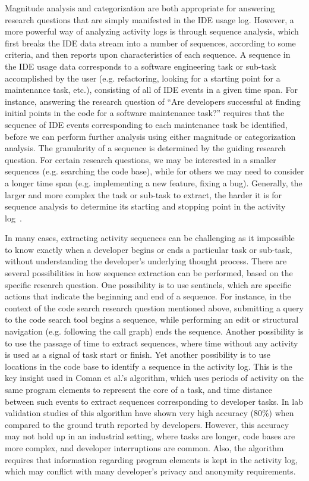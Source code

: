 Magnitude analysis and categorization are both appropriate for answering research questions that are simply manifested in the IDE usage log. However, a more powerful way of analyzing activity logs is through sequence analysis, which first breaks the IDE data stream into a number of sequences, according to some criteria, and then reports upon characteristics of each sequence. A sequence in the IDE usage data corresponds to a software engineering task or sub-task accomplished by the user (e.g. refactoring, looking for a starting point for a maintenance task, etc.), consisting of all of IDE events in a given time span. For instance, answering the research question of ``Are developers successful at finding initial points in the code for a software maintenance task?'' requires that the sequence of IDE events corresponding to each maintenance task be identified, before we can perform further analysis using either magnitude or categorization analysis. The granularity of a sequence is determined by the guiding research question. For certain research questions, we may be interested in a smaller sequences (e.g. searching the code base), while for others we may need to consider a longer time span (e.g. implementing a new feature, fixing a bug). 
Generally, the larger and more complex the task or sub-task to extract, the harder it is for sequence analysis to determine its starting and stopping point in the activity log~\cite{Zou-ComanIndustry}.

In many cases, extracting activity sequences can be challenging as it impossible to know exactly when a developer begins or ends a particular task or sub-task, without understanding the developer's underlying thought process. There are several possibilities in how sequence extraction can be performed, based on the specific research question. One possibility is to use sentinels, which are specific actions that indicate the beginning and end of a sequence. For instance, in the context of the code search research question mentioned above, submitting a query to the code search tool begins a sequence, while performing an edit or structural navigation (e.g. following the call graph) ends the sequence. Another possibility is to use the passage of time to extract sequences, where time without any activity is used as a signal of task start or finish. Yet another possibility is to use locations in the code base to identify a sequence in the activity log. This is the key insight used in Coman et al.'s \cite{Coman-TaskIdent} algorithm, which uses periods of activity on the same program elements to represent the core of a task, and time distance between such events to extract sequences corresponding to developer tasks. In lab validation studies of this algorithm have shown very high accuracy (80\%) when compared to the ground truth reported by developers. However, this accuracy may not hold up in an industrial setting\cite{Zou-ComanIndustry}, where tasks are longer, code bases are more complex, and developer interruptions are common. Also, the algorithm requires that information regarding program elements is kept in the activity log, which may conflict with many developer's privacy and anonymity requirements.



